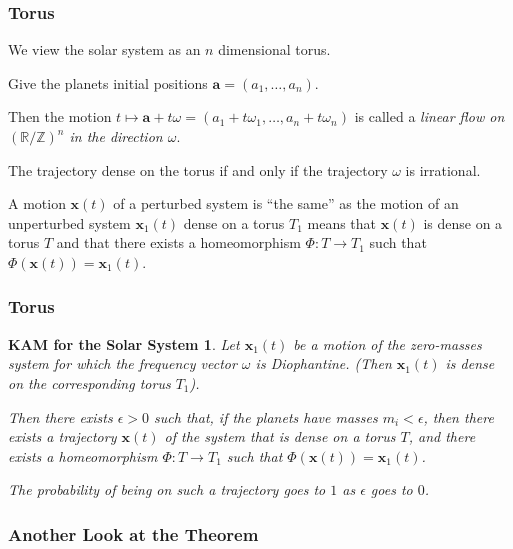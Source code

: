 \documentclass{beamer}
\newcommand{\Z}{\mathbb{Z}}
\newcommand{\R}{\mathbb{R}}
\newcommand{\bp}[1]{\bm{#1}}
\begin{document}
\begin{frame}
  \frametitle{Torus}
  We view the solar system as an $n$ dimensional torus.

  Give the planets initial positions $\bp{a} = (a_1, \ldots, a_n)$.

  Then the motion $t \mapsto \bp{a} + t \omega = (a_1 + t \omega_1, \ldots, a_n
  + t \omega_n)$ is called a \emph{linear flow on $(\R / \Z)^n$ in the direction
    $\omega$}.

  The trajectory dense on the torus if and only if the trajectory $\omega$ is
  irrational.

  A motion $\bp{x}(t)$ of a perturbed system is ``the same'' as the motion of an
  unperturbed system $\bp{x}_1(t)$ dense on a torus $T_1$ means that $\bp{x}(t)$
  is dense on a torus $T$ and that there exists a homeomorphism $\Phi : T \to
  T_1$ such that $\Phi(\bp{x}(t)) = \bp{x}_1(t)$.
\end{frame}

\begin{frame}
  \frametitle{Torus}
  \newtheorem{kamsolar}{KAM for the Solar System}
  \begin{kamsolar}
    Let $\bp{x}_1(t)$ be a motion of the zero-masses system for which the
    frequency vector $\omega$ is Diophantine.
    (Then $\bp{x}_1(t)$ is dense on the corresponding torus $T_1$).

    Then there exists $\epsilon > 0$ such that, if the planets have masses $m_i
    < \epsilon$, then there exists a trajectory $\bp{x}(t)$ of the system that
    is dense on a torus $T$, and there exists a homeomorphism $\Phi : T \to T_1$
    such that $\Phi(\bp{x}(t)) = \bp{x}_1(t)$.

    The probability of being on such a trajectory goes to $1$ as $\epsilon$ goes
    to $0$.
  \end{kamsolar}
\end{frame}

\begin{frame}
  \frametitle{Another Look at the Theorem}
  \begin{kamthm}
    \KAM{}
  \end{kamthm}
\end{frame}
\end{document}
